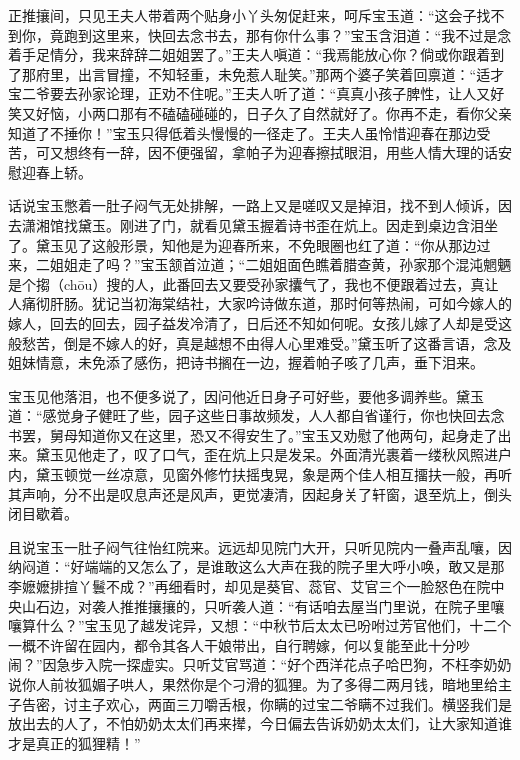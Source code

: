 \documentclass[12pt,oneside]{book}
\begin{document}
正推攘间，只见王夫人带着两个贴身小丫头匆促赶来，呵斥宝玉道：“这会子找不到你，竟跑到这里来，快回去念书去，那有你什么事？”宝玉含泪道：“我不过是念着手足情分，我来辞辞二姐姐罢了。”王夫人嗔道：“我焉能放心你？倘或你跟着到了那府里，出言冒撞，不知轻重，未免惹人耻笑。”那两个婆子笑着回禀道：“适才宝二爷要去孙家论理，正劝不住呢。”王夫人听了道：“真真小孩子脾性，让人又好笑又好恼，小两口那有不磕磕碰碰的，日子久了自然就好了。你再不走，看你父亲知道了不捶你！”宝玉只得低着头慢慢的一径走了。王夫人虽怜惜迎春在那边受苦，可又想终有一辞，因不便强留，拿帕子为迎春擦拭眼泪，用些人情大理的话安慰迎春上轿。

话说宝玉憋着一肚子闷气无处排解，一路上又是嗟叹又是掉泪，找不到人倾诉，因去潇湘馆找黛玉。刚进了门，就看见黛玉握着诗书歪在炕上。因走到桌边含泪坐了。黛玉见了这般形景，知他是为迎春所来，不免眼圈也红了道：“你从那边过来，二姐姐走了吗？”宝玉颔首泣道；“二姐姐面色瞧着腊查黄，孙家那个混沌魍魉是个搊（chōu）搜的人，此番回去又要受孙家攮气了，我也不便跟着过去，真让人痛彻肝肠。犹记当初海棠结社，大家吟诗做东道，那时何等热闹，可如今嫁人的嫁人，回去的回去，园子益发冷清了，日后还不知如何呢。女孩儿嫁了人却是受这般愁苦，倒是不嫁人的好，真是越想不由得人心里难受。”黛玉听了这番言语，念及姐妹情意，未免添了感伤，把诗书搁在一边，握着帕子咳了几声，垂下泪来。

宝玉见他落泪，也不便多说了，因问他近日身子可好些，要他多调养些。黛玉道：“感觉身子健旺了些，园子这些日事故频发，人人都自省谨行，你也快回去念书罢，舅母知道你又在这里，恐又不得安生了。”宝玉又劝慰了他两句，起身走了出来。黛玉见他走了，叹了口气，歪在炕上只是发呆。外面清光裹着一缕秋风照进户内，黛玉顿觉一丝凉意，见窗外修竹扶摇曳晃，象是两个佳人相互㩅扶一般，再听其声响，分不出是叹息声还是风声，更觉凄清，因起身关了轩窗，退至炕上，倒头闭目歇着。

且说宝玉一肚子闷气往怡红院来。远远却见院门大开，只听见院内一叠声乱嚷，因纳闷道：“好端端的又怎么了，是谁敢这么大声在我的院子里大呼小唤，敢又是那李嬷嬷排揎丫鬟不成？”再细看时，却见是葵官、蕊官、艾官三个一脸怒色在院中央山石边，对袭人推推攘攘的，只听袭人道：“有话咱去屋当门里说，在院子里嚷嚷算什么？”宝玉见了越发诧异，又想：“中秋节后太太已吩咐过芳官他们，十二个一概不许留在园内，都令其各人干娘带出，自行聘嫁，何以复能至此十分吵闹？”因急步入院一探虚实。只听艾官骂道：“好个西洋花点子哈巴狗，不枉李奶奶说你人前妆狐媚子哄人，果然你是个刁滑的狐狸。为了多得二两月钱，暗地里给主子告密，讨主子欢心，两面三刀嚼舌根，你瞒的过宝二爷瞒不过我们。横竖我们是放出去的人了，不怕奶奶太太们再来撵，今日偏去告诉奶奶太太们，让大家知道谁才是真正的狐狸精！”
\end{document}
